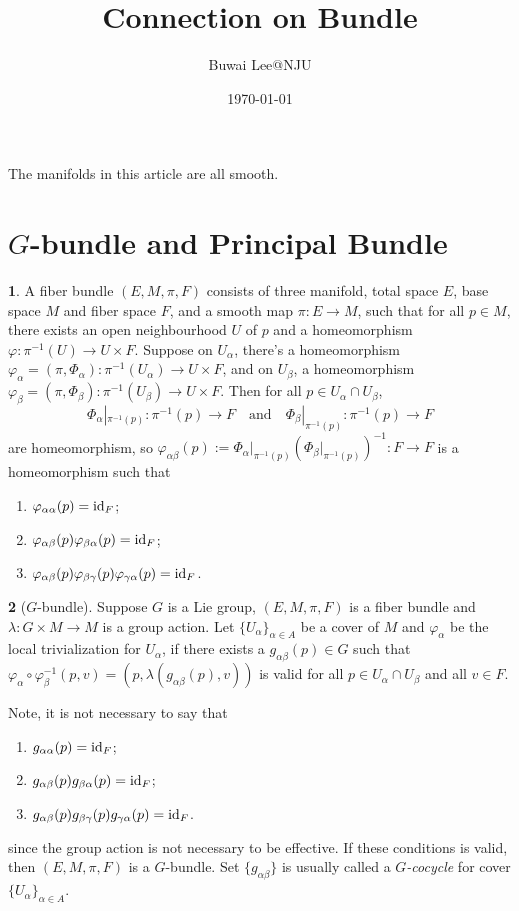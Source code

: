 \documentclass[11pt]{article}
\theoremstyle{definition}
\newtheorem{para}{}[part]
\begin{document}
\title{Connection on Bundle}
\author{Buwai Lee@NJU}
\date{\today}
\maketitle %

The manifolds in this article are all smooth.

\section{$G$-bundle and Principal Bundle}

\begin{para}
A fiber bundle $(E,M,\pi,F)$ consists of three manifold, total space $E$, base space $M$ and fiber space $F$, and a smooth map $\pi:E\to M$, such that for all $p\in M$, there exists an open neighbourhood $U$ of $p$ and a homeomorphism $\varphi:\pi^{-1}(U)\to U\times F$. 
Suppose on $U_{\alpha}$, there's a homeomorphism $\varphi_\alpha=(\pi,\Phi_\alpha):\pi^{-1}(U_\alpha)\to U\times F$, and on $U_\beta$, a homeomorphism $\varphi_\beta=(\pi,\Phi_\beta):\pi^{-1}(U_\beta)\to U\times F$. Then for all $p\in U_\alpha\cap U_\beta$,
\[
	\Phi_{\alpha}|_{\pi^{-1}(p)}:\pi^{-1}(p)\to F\quad \text{and}\quad \Phi_{\beta}|_{\pi^{-1}(p)}:\pi^{-1}(p)\to F
\]
are homeomorphism, so $\varphi_{\alpha\beta}(p):=\Phi_{\alpha}|_{\pi^{-1}(p)}(\Phi_{\beta}|_{\pi^{-1}(p)})^{-1}:F\to F$ is a homeomorphism such that
\begin{enumerate}
	\item $\varphi_{\alpha\alpha}(p)=\operatorname{id}_F$;
	\item $\varphi_{\alpha\beta}(p)\varphi_{\beta\alpha}(p)=\operatorname{id}_F$;
	\item $\varphi_{\alpha\beta}(p)\varphi_{\beta\gamma}(p)\varphi_{\gamma\alpha}(p)=\operatorname{id}_F$.
\end{enumerate}
\end{para}

\begin{para}[$G$-bundle]
Suppose $G$ is a Lie group, $(E,M,\pi,F)$ is a fiber bundle and $\lambda:G\times M\to M$ is a group action. Let $\{U_\alpha\}_{\alpha\in A}$ be a cover of $M$ and $\varphi_\alpha$ be the local trivialization for $U_\alpha$, if there exists a $g_{\alpha\beta}(p)\in G$ such that $\varphi_{\alpha}\circ \varphi_{\beta}^{-1}(p,v)=(p,\lambda(g_{\alpha\beta}(p),v))$ is valid for all $p\in U_\alpha\cap U_\beta$ and all $v\in F$. 

Note, it is not necessary to say that 
\begin{enumerate}
	\item $g_{\alpha\alpha}(p)=\operatorname{id}_F$;
	\item $g_{\alpha\beta}(p)g_{\beta\alpha}(p)=\operatorname{id}_F$;
	\item $g_{\alpha\beta}(p)g_{\beta\gamma}(p)g_{\gamma\alpha}(p)=\operatorname{id}_F$.
\end{enumerate}
since the group action is not necessary to be {\color{blue} effective}. If these conditions is valid, then $(E,M,\pi,F)$ is a $G$-bundle. Set $\{g_{\alpha\beta}\}$ is usually called a \textit{$G$-cocycle} for cover $\{U_\alpha\}_{\alpha\in A}$.
\end{para}
\end{document}
